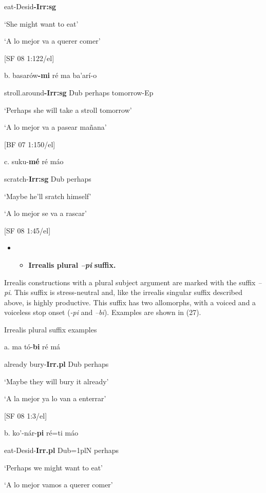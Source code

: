    eat-Desid\textbf{{}-Irr:sg}    

  ‘She might want to eat’

‘A lo mejor va a querer comer’      

[SF 08 1:122/el]

b.   basarów\textbf{{}-mi}    ré  ma    ba’arí-o

stroll.around\textbf{{}-Irr:sg}  Dub  perhaps  tomorrow-Ep

‘Perhaps she will take a stroll tomorrow’

‘A lo mejor va a pasear mañana’      

[BF 07 1:150/el]

c.   suku-\textbf{mé}  ré  máo

  scratch-\textbf{Irr:sg}  Dub  perhaps

  ‘Maybe he’ll sratch himself’

  ‘A lo mejor se va a rascar’        

  [SF 08 1:45/el]  

\begin{itemize}
\item \begin{itemize}
\item \textbf{Irrealis plural \textit{–pi} }\textbf{suffix.}
\end{itemize}
\end{itemize}

Irrealis constructions with a plural subject argument are marked with the suffix \textit{–pi}. This suffix is stress-neutral and, like the irrealis singular suffix described above, is highly productive. This suffix has two allomorphs, with a voiced and a voiceless stop onset (\textit{{}-pi} and \textit{–bi}). Examples are shown in (27).

  Irrealis plural suffix examples

  a.  ma     tó-\textbf{bi}    ré  má

    already    bury-\textbf{Irr.pl}  Dub  perhaps

    ‘Maybe they will bury it already’

    ‘A la mejor ya lo van a enterrar’      

    [SF 08 1:3/el]

  b.  ko’-nár-\textbf{pi}     ré=ti     máo

eat-Desid-\textbf{Irr.pl} Dub=1plN  perhaps

‘Perhaps we might want to eat’

‘A lo mejor vamos a querer comer’      

